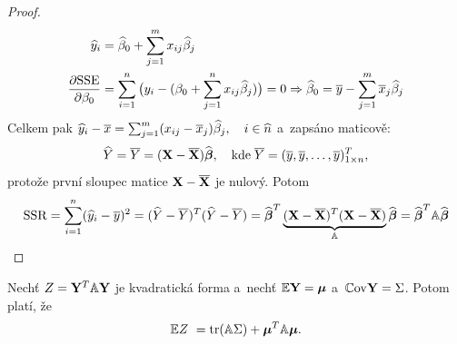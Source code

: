 \begin{proof}
	
\begin{align*}
	\hyi & = \wbeta_0 + \sumjm x_{ij} \wbeta_j \\
	\frac{\partial \SSE}{\partial \beta_0} & = \sumin \big(y_i - (\beta_0 + \sumjn x_{ij} \wbeta_j) \big) = 0 \Rightarrow \wbeta_0 = \ly - \sumjm \lx_j \wbeta_j
\end{align*}
Celkem pak $\hy_i - \lx = \sumjm (x_{ij} - \lx_j) \wbeta_j, \quad i\in\widehat{n} $ a~zapsáno maticově:
 $$
\hY = \lY = (\X - \lX) \wbetab, \quad \text{kde} \; \lY = (\ly, \ly,\dots, \ly)_{1 \times n}^T,
 $$
protože první sloupec matice $\X - \lX$ je nulový. Potom
 $$
\SSR = \sumin (\hy_i - \ly)^2 = (\hY - \lY)^T(\hY - \lY) = \wbetab^T \underbrace{(\X - \lX)^T(\X - \lX)}_{\Am} \wbetab = \wbetab^T \Am \wbetab
 $$

\end{proof}

\begin{theorem}
	Nechť $Z = \Y^T \Am \Y$ je kvadratická forma a~nechť $\E \Y = \bmu$ a~$\Cov \Y = \Sigma$. Potom platí, že
	 $$
		\E Z~ = \trace(\Am \Sigma) + \bmu^T \Am \bmu.
	 $$
\end{theorem}

